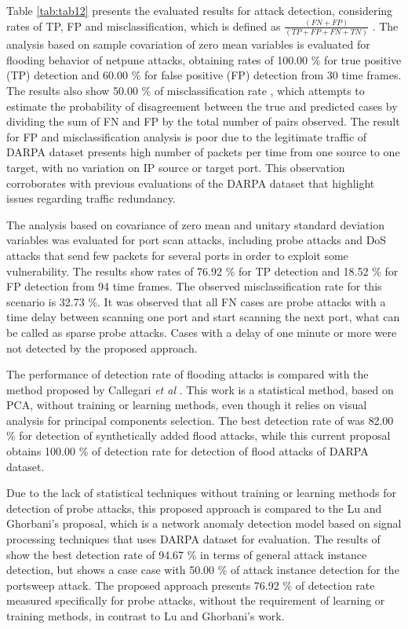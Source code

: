 \documentclass[review]{elsarticle}
\begin{document}
Table \ref{tab:tab12} presents the evaluated results for attack detection, considering rates of TP, FP \cite{fleiss2013statistical} and misclassification, which is defined as $\frac{(FN+FP)}{(TP+FP+FN+TN)}$ \cite{bhuyan2014network}. The analysis based on sample covariation of zero mean variables is evaluated for flooding behavior of netpune attacks, obtaining rates of 100.00 \% for true positive (TP) detection and 60.00 \% for false positive (FP) detection from 30 time frames. The results also show 50.00 \% of misclassification rate , which attempts to estimate the probability of disagreement between the true and predicted cases by dividing the sum of FN and FP by the total number of pairs observed. 
The result for FP and misclassification analysis is poor due to the legitimate traffic of DARPA dataset presents high number of packets per time  from one source to one target, with no variation on IP source or target port. This observation corroborates with previous evaluations of the DARPA dataset that highlight issues regarding traffic redundancy. 

The analysis based on covariance of zero mean and unitary standard deviation variables was evaluated for port scan attacks, including probe attacks and DoS attacks that send few packets for several ports in order to exploit some vulnerability. The results show rates of 76.92 \% for TP detection and 18.52 \% for FP detection from 94 time frames. The observed misclassification rate for this scenario is 32.73 \%. It was observed that all FN cases are probe attacks with a time delay between scanning one port and start scanning the next port, what can be called as sparse probe attacks. Cases with a delay of one minute or more were not detected by the proposed approach.

The performance of detection rate of flooding attacks is compared with the method proposed by Callegari \emph{et al} \cite{Zonglin2009}. This work is a statistical method, based on PCA, without training or learning methods, even though it relies on visual analysis for principal components selection. The best detection rate of \cite{Zonglin2009} was 82.00 \% for detection of synthetically added flood attacks, while this current proposal obtains 100.00 \% of detection rate for detection of flood attacks of DARPA dataset.

Due to the lack of statistical techniques without training or learning methods for detection of probe attacks, this proposed approach is compared to the Lu and Ghorbani's \cite{Lu2009} proposal, which is a network anomaly detection model based on signal processing techniques that uses DARPA dataset for evaluation. The results of \cite{Lu2009} show the best detection rate of 94.67 \% in terms of general attack instance detection, but shows a case case with 50.00 \% of attack instance detection for the portsweep attack. The proposed approach presents 76.92 \% of detection rate measured specifically for probe attacks, without the requirement of learning or training methods, in contrast to Lu and Ghorbani's \cite{Lu2009} work.
\end{document}
